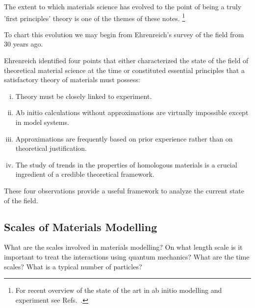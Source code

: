 The extent to which materials science has evolved to the point of being 
a truly 'first principles' theory is one of the themes of these notes. 
\footnote{For recent overview of the state of the art in ab initio modelling 
and experiment see Refs.~\cite{finnis12, ismailbeigi2017}.}
%
%

To chart this evolution we may begin from Ehrenreich's survey of the field from 30 years ago.

Ehrenreich identified four points that either characterized the state 
of the field of theoretical material science at the time or constituted essential principles 
that a satisfactory theory of materials must possess:
%
\begin{enumerate}[i)]
\label{en:ehrenreich}
\item Theory must be closely linked to experiment.
\item Ab initio calculations without approximations are virtually impossible 
      except in model systems.
\item Approximations are frequently based on prior experience rather 
      than on theoretical justification.
\item The study of trends in the properties of homologous materials 
      is a crucial ingredient of a credible theoretical framework.
\end{enumerate}
%
These four observations provide a useful framework to analyze the current state of the field.




\subsection{Scales of Materials Modelling}
What are the scales involved in materials modelling?
On what length scale is it important to treat the interactions
using quantum mechanics? What are the time scales? 
What is a typical number of particles?

